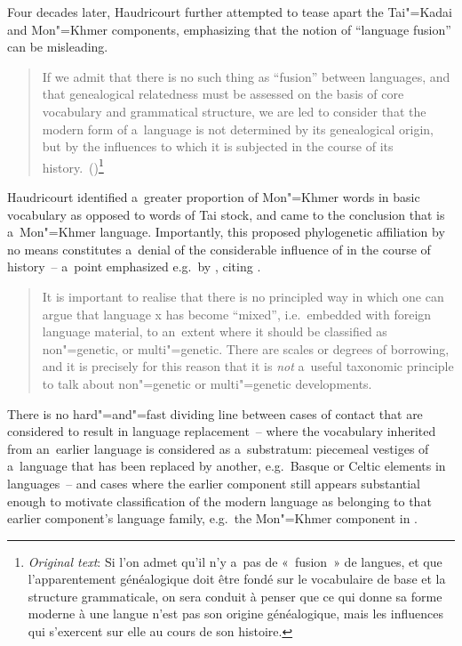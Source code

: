 Four decades later, Haudricourt further attempted to tease apart the Tai"=Kadai and Mon"=Khmer components, emphasizing that the notion of “language fusion” can be misleading.

\begin{quotation}
	If we admit that there is no such thing as “fusion” between languages, and that genealogical
	relatedness must be assessed on the basis of core vocabulary and grammatical structure, we are led
	to consider that the modern form of a~language is not determined by its genealogical origin, but
	by the influences to which it is subjected in the course of its history.~(\citealt[121--122]{haudricourt1953a})\footnote{\textit{Original text}: Si l'on admet qu'il n'y a~pas de «~fusion~» de langues, et que l'apparentement généalogique doit être fondé sur le vocabulaire de base et la structure grammaticale, on sera conduit à penser que ce qui donne sa forme moderne à une langue n'est pas son origine généalogique, mais les influences qui s'exercent sur elle au cours de son histoire.}
\end{quotation}

Haudricourt identified a~greater proportion of Mon"=Khmer words in basic vocabulary as opposed to words of Tai stock, and came to the conclusion that  is a~Mon"=Khmer language. Importantly, this proposed phylogenetic affiliation by no means constitutes a~denial of the considerable influence of  in the course of history~-- a~point emphasized e.g.\ by \citet[268-271]{dimmendaal2011}, citing \citet{manessy1990}. 

\begin{quotation}
	It is important to realise that there is no principled way in which one can argue that language x has become “mixed”, i.e.\ embedded with foreign language material, to an~extent where it should be classified as non"=genetic, or multi"=genetic. There are scales or degrees of borrowing, and it is precisely for this reason that it is \textit{not} a~useful taxonomic principle to talk about non"=genetic or multi"=genetic developments. \citep[271]{dimmendaal2011}
\end{quotation}

There is no hard"=and"=fast dividing line between cases of contact that are considered to result in language replacement~-- where the vocabulary inherited from an~earlier language is considered as a~substratum: piecemeal vestiges of a~language that has been replaced by another, e.g.~Basque or Celtic elements in  languages~-- and cases where the earlier component still appears substantial enough to motivate classification of the modern language as belonging to that earlier component’s language family, e.g.~the Mon"=Khmer component in .

